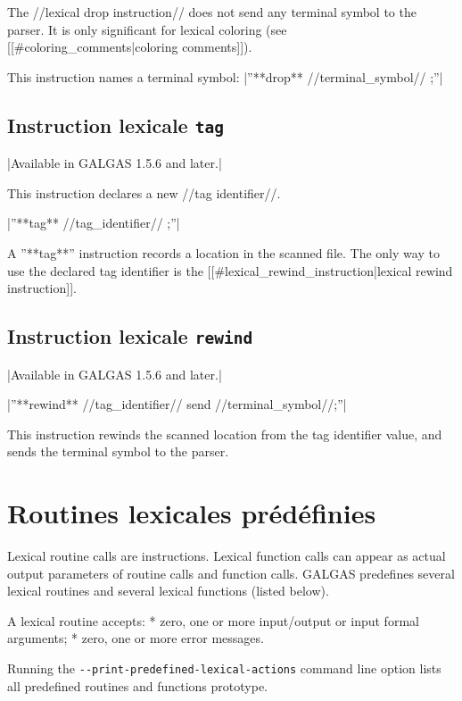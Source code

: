 The //lexical drop instruction// does not send any terminal symbol to the parser. It is only significant for lexical coloring (see [[\#coloring\_comments|coloring comments]]).

This instruction names a terminal symbol:
|''**drop** //terminal\_symbol// ;''|


\subsection{Instruction lexicale \texttt{tag}}

|Available in GALGAS 1.5.6 and later.|

This instruction declares a new //tag identifier//.

|''**tag** //tag\_identifier// ;''|

A ''**tag**'' instruction records a location in the scanned file. The only way to use the declared tag identifier is the [[\#lexical\_rewind\_instruction|lexical rewind instruction]].

\subsection{Instruction lexicale \texttt{rewind}}

|Available in GALGAS 1.5.6 and later.|

|''**rewind** //tag\_identifier// send //terminal\_symbol//;''|

This instruction rewinds the scanned location from the tag identifier value, and sends the terminal symbol to the parser.








\section{Routines lexicales prédéfinies}

Lexical routine calls are instructions. Lexical function calls can appear as actual output parameters of routine calls and function calls. GALGAS predefines several lexical routines and several lexical functions (listed below).

A lexical routine accepts:
  * zero, one or more input/output or input formal arguments;
  * zero, one or more error messages.

Running the \texttt{-{}-print-predefined-lexical-actions} command line option lists all predefined routines and functions prototype.

